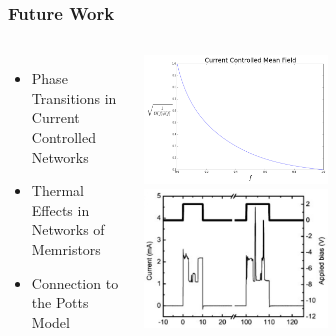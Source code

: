 \documentclass[mathserif]{beamer}
\begin{document}
\begin{frame}
\frametitle{Future Work}
\begin{columns}
\begin{itemize}
\item Phase Transitions in Current Controlled Networks
\item Thermal Effects in Networks of Memristors
\item Connection to the Potts Model
\end{itemize}
\includegraphics[width=0.5\textwidth]{Current_MF.png}
\includegraphics[width=0.5\textwidth]{ASN_jumps.png}

\end{columns}
\end{frame}
\end{document}
